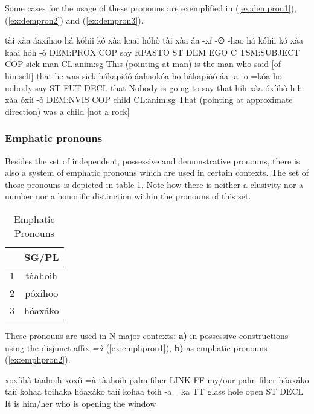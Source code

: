\documentclass[a4paper, 12pt, oneside]{memoir}
\newcommand{\emh}[1]{\textit{#1}}
\begin{document}
Some cases for the usage of these pronouns are exemplified in (\ref{ex:dempron1}), (\ref{ex:dempron2}) and (\ref{ex:dempron3}).
\begin{examples}
\ex \label{ex:dempron1}
\words tài xàa áaxíhao há kóhii kó xàa kaai hóhò
\bits tài xàa áa -xí -∅ -hao há kóhii kó xàa kaai hóh -ò  
\gloss DEM:PROX COP say RPASTO ST DEM EGO C TSM:SUBJECT COP sick man CL:anim:sg
\tr This (pointing at man) is the man who said [of himself] that he was sick
\ex \label{ex:dempron2}
\words hákapióó áahaokóa ho
\bits hákapióó áa -a -o =kóa ho
\gloss nobody say ST FUT DECL that
\tr Nobody is going to say that
\ex \label{ex:dempron3}
\words hih xàa óxííhò
\bits hih xàa óxíí -ò 
\gloss  DEM:NVIS COP child CL:anim:sg
\tr That (pointing at approximate direction) was a child [not a rock]
\end{examples}
\subsubsection{Emphatic pronouns}
Besides the set of independent, possessive and demonstrative pronouns, there is also a system of emphatic pronouns which are used in certain contexts. The set of those pronouns is depicted in table \ref{t:emphpron}. Note how there is neither a clusivity nor a number nor a honorific distinction within the pronouns of this set.
\begin{table}[H]
    \begin{centering}
    \begin{tabular}{@{}lc@{}}
    \toprule
    \multicolumn{1}{c}{} & SG/PL    \\ \midrule
    1                    & tàahoih  \\
    2                    & póxihoo  \\
    3                    & hóaxáko \\ \bottomrule
    \end{tabular}
    \caption{Emphatic Pronouns}
    \label{t:emphpron}
    \end{centering}
\end{table}
These pronouns are used in N major contexts: \textbf{a)} in possessive constructions using the disjunct affix \emh{=à} (\ref{ex:emphpron1}), \textbf{b)} as emphatic pronouns (\ref{ex:emphpron2}). 
\begin{examples}
    \ex \label{ex:emphpron1}
    \words xoxííhà tàahoih
    \bits xoxíí =à tàahoih
    \gloss palm.fiber LINK FF
    \tr my/our palm fiber
    \ex \label{ex:emphpron2}
    \words hóaxáko taíí kohaa toihaka 
    \bits hóaxáko taíí kohaa toih -a =ka 
    \gloss TT glass hole open ST DECL
    \tr It is him/her who is opening the window
\end{examples}
\end{document}
